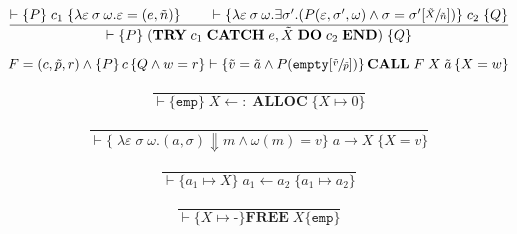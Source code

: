\begin{equation}\label{eqn:hoare-catch}
\frac{\vdash \{P\} \; c_1 \; \{\lambda \varepsilon\:\sigma\:\omega. \varepsilon = (e, \tilde{n})\} \qquad \vdash \{\lambda \varepsilon\:\sigma\:\omega. \exists \sigma'. (P(\varepsilon, \sigma', \omega) \wedge \sigma = \sigma'[\sfrac{\tilde{X}}{\tilde{n}}])\} \; c_2 \; \{Q\}}{\vdash \{P\} \; (\textbf{TRY}\; c_1\; \textbf{CATCH}\; e, \tilde{X}\; \textbf{DO}\; c_2\; \textbf{END}) \; \{Q\}}
\end{equation}

\begin{equation}\label{eqn:hoare-call}
F = (c,\tilde{p},r) \wedge \left\{P\right\} c \left\{Q \wedge w = r\right\} \vdash \left\{\tilde{v} = \tilde{a} \wedge P(\texttt{empty}[\sfrac{\tilde{v}}{\tilde{p}}])\right\}\textbf{CALL} \; F \; X \; \tilde{a} \left\{X = w\right\}
\end{equation}

\begin{equation}\label{eqn:hoare-alloc}
\frac{}{\vdash \{ \texttt{emp} \}\; X\leftarrow:\;\textbf{ALLOC}\; \{X \mapsto 0\}}
\end{equation}

\begin{equation}\label{eqn:hoare-read}
\frac{}{\vdash \{\; \lambda\varepsilon\;\sigma\;\omega.(a,\sigma)\Downarrow m \wedge \omega(m) = v\}\; a \rightarrow X \;\{ X = v \}}
\end{equation}

\begin{equation}\label{eqn:hoare-write}
\frac{}{\vdash \{ a_1 \mapsto X \}\; a_1 \leftarrow a_2 \;\{ a_1 \mapsto a_2 \}}
\end{equation}

\begin{equation}\label{eqn:hoare-free}
\frac{}{\vdash \{X \mapsto \textbf{-}\}\textbf{FREE}\;X \{\texttt{emp} \}}
\end{equation}
